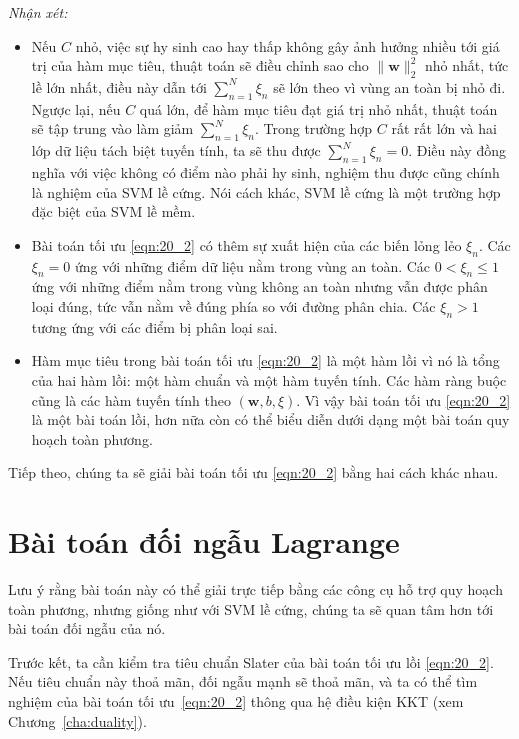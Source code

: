  
\textit{Nhận xét:} 
\begin{itemize}
    \item Nếu $C$ nhỏ, việc {sự hy sinh} cao hay thấp không gây ảnh hưởng
    nhiều tới giá trị của hàm mục tiêu, thuật toán sẽ điều chỉnh sao cho
    $\|\mathbf{w}\|_2^2$ nhỏ nhất, tức lề lớn nhất, điều này
    dẫn tới $\sum_{n=1}^N\xi_n$ sẽ lớn theo vì vùng an toàn bị nhỏ đi. Ngược
    lại, nếu $C$ quá lớn, để hàm mục tiêu đạt giá trị nhỏ nhất, thuật toán sẽ
    tập trung vào làm giảm $\sum_{n=1}^N\xi_n$. Trong trường hợp $C$ rất rất lớn
    và hai lớp dữ liệu tách biệt tuyến tính, ta sẽ thu được $\sum_{n=1}^N\xi_n
    = 0$. Điều này đồng nghĩa với
    việc không có điểm nào phải {hy sinh}, nghiệm thu được cũng chính là nghiệm của SVM lề cứng. Nói cách khác, SVM lề cứng là
    một trường hợp đặc biệt của SVM lề mềm.
     
    \item Bài toán tối ưu \eqref{eqn:20_2} có thêm sự xuất hiện của các
    biến lỏng lẻo $\xi_n$. Các $\xi_n = 0$ ứng với những
    điểm dữ liệu nằm trong {vùng an toàn}. Các $0 < \xi_n \leq 1$ ứng với những điểm nằm trong {vùng không an toàn} nhưng vẫn được phân
    loại
    đúng, tức vẫn nằm về đúng phía so với đường phân chia. Các $\xi_n > 1$
    tương ứng với các điểm bị phân loại sai.
     
    \item Hàm mục tiêu trong bài toán tối ưu \eqref{eqn:20_2} là một hàm lồi vì nó là tổng của hai hàm lồi: một hàm chuẩn và một hàm tuyến tính. Các hàm ràng buộc cũng là các hàm tuyến tính theo $(\mathbf{w}, b, \xi)$. Vì vậy bài toán tối ưu \eqref{eqn:20_2} là một bài toán lồi, hơn nữa còn có thể biểu diễn dưới dạng một bài toán quy hoạch toàn phương.  
\end{itemize}
 
Tiếp theo, chúng ta sẽ giải bài toán tối ưu \eqref{eqn:20_2} bằng hai
cách khác nhau. 
 
\section{Bài toán đối ngẫu Lagrange }
Lưu ý rằng bài toán này có thể giải trực tiếp bằng các công cụ hỗ trợ quy hoạch toàn phương, nhưng
giống như với SVM lề cứng, chúng ta sẽ quan tâm hơn tới bài toán đối ngẫu của nó. 
 
Trước kết, ta cần kiểm tra tiêu chuẩn Slater của bài toán tối ưu lồi
\eqref{eqn:20_2}. Nếu tiêu chuẩn này thoả mãn, đối ngẫu mạnh sẽ
thoả mãn, và ta có thể tìm nghiệm của bài toán tối ưu~\eqref{eqn:20_2} thông qua
hệ điều kiện KKT (xem Chương~\ref{cha:duality}). 
 
